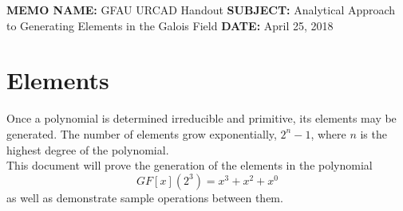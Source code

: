 \documentclass[12pt]{extarticle}
\begin{document}
    \documentinfo
    {\textbf{MEMO NAME:} GFAU URCAD Handout}
    {\textbf{SUBJECT: } Analytical Approach to Generating Elements in the Galois Field}
    {\textbf{DATE: } April 25, 2018 }

\section{Elements}

    Once a polynomial is determined irreducible and primitive, its elements may
    be generated. The number of elements grow exponentially, $2^{n}-1$, where
    $n$ is the highest degree of the polynomial. \\ This document will prove
    the generation of the elements in the polynomial
    \begin{equation*}
        GF[x](2^3) = x^3+x^2+x^0
    \end{equation*}
    as well as demonstrate sample operations between them.
\end{document}
